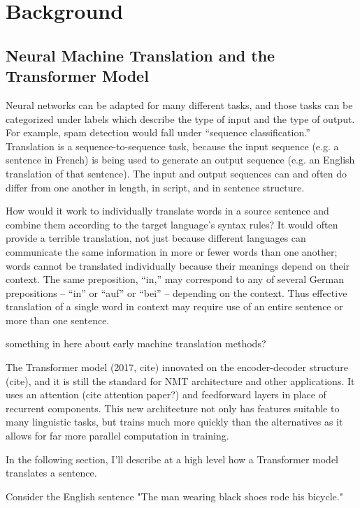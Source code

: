 \chapter{Background}
\label{chap:background}

\section{Neural Machine Translation and the Transformer Model}

Neural networks can be adapted for many different tasks, and those tasks can be categorized under labels which describe the type of input and the type of output. For example, spam detection would fall under “sequence classification.” Translation is a sequence-to-sequence task, because the input sequence (e.g. a sentence in French) is being used to generate an output sequence (e.g. an English translation of that sentence). The input and output sequences can and often do differ from one another in length, in script, and in sentence structure.

How would it work to individually translate words in a source sentence and combine them according to the target language’s syntax rules? It would often provide a terrible translation, not just because different languages can communicate the same information in more or fewer words than one another; words cannot be translated individually because their meanings depend on their context. The same preposition, “in,” may correspond to any of several German prepositions – “in” or “auf” or “bei” – depending on the context. Thus effective translation of a single word in context may require use of an entire sentence or more than one sentence.

something in here about early machine translation methods?

The Transformer model (2017, cite) innovated on the encoder-decoder structure (cite), and it is still the standard for NMT architecture and other applications. It uses an attention (cite attention paper?) and feedforward layers in place of recurrent components. This new architecture not only has features suitable to many linguistic tasks, but trains much more quickly than the alternatives as it allows for far more parallel computation in training.

In the following section, I'll describe at a high level how a Transformer model translates a sentence.

Consider the English sentence "The man wearing black shoes rode his bicycle."

